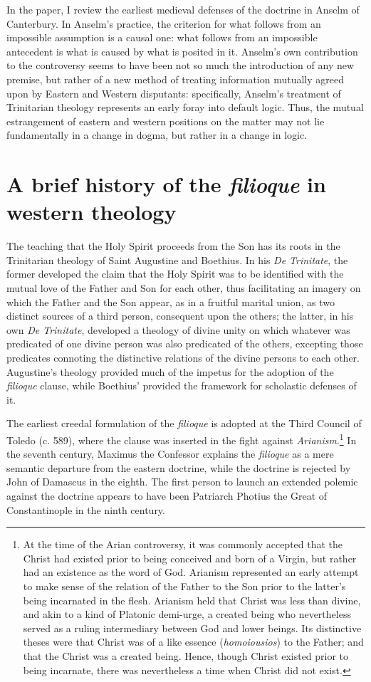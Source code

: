 \documentclass[]{article}
\begin{document}
In the paper, I review the earliest medieval defenses of the doctrine in Anselm of Canterbury. In Anselm's practice, the criterion for what follows from an impossible assumption is a causal one: what follows from an impossible antecedent is what is caused by what is posited in it. Anselm's own contribution to the controversy seems to have been not so much the introduction of any new premise, but rather of a new method of treating information mutually agreed upon by Eastern and Western disputants: specifically, Anselm's treatment of Trinitarian theology represents an early foray into default logic. Thus, the mutual estrangement of eastern and western positions on the matter may not lie fundamentally in a change in dogma, but rather in a change in logic.
\section{A brief history of the \textit{filioque} in western theology}
The teaching that the Holy Spirit proceeds from the Son has its roots in the Trinitarian theology of Saint Augustine and Boethius. In his \textit{De Trinitate}, the former developed the claim that the Holy Spirit was to be identified with the mutual love of the Father and Son for each other, thus facilitating an imagery on which the Father and the Son appear, as in a fruitful marital union, as two distinct sources of a third person, consequent upon the others; the latter, in his own \textit{De Trinitate}, developed a theology of divine unity on which whatever was predicated of one divine person was also predicated of the others, excepting those predicates connoting the distinctive relations of the divine persons to each other. Augustine's theology provided much of the impetus for the adoption of the \textit{filioque} clause, while Boethius' provided the framework for scholastic defenses of it.

The earliest creedal formulation of the \textit{filioque} is adopted at the Third Council of Toledo (c. 589), where the clause was inserted in the fight against \textit{Arianism}.\footnote{At the time of the Arian controversy, it was commonly accepted that the Christ had existed prior to being conceived and born of a Virgin, but rather had an existence as the word of God. Arianism represented an early attempt to make sense of the relation of the Father to the Son prior to the latter's being incarnated in the flesh. Arianism held that Christ was less than divine, and akin to a kind of Platonic demi-urge, a created being who nevertheless served as a ruling intermediary between God and lower beings. Its distinctive theses were that Christ was of a like essence (\textit{homoiousios}) to the Father; and that the Christ was a created being. Hence, though Christ existed prior to being incarnate, there was nevertheless a time when Christ did not exist.} In the seventh century, Maximus the Confessor explains the \textit{filioque} as a mere semantic departure from the eastern doctrine, while the doctrine is rejected by John of Damascus in the eighth. The first person to launch an extended polemic against the doctrine appears to have been Patriarch Photius the Great of Constantinople in the ninth century.
\end{document}
